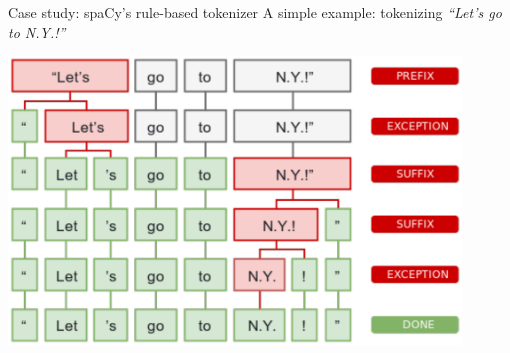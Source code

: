 \documentclass[style=upen, size=14pt]{powerdot}
\theoremstyle{definition}
\begin{document}
\begin{slide}[toc=spaCy]{Case study: spaCy's rule-based tokenizer}
  A simple example: tokenizing \emph{``Let's go to N.Y.!''}
    \begin{center}
      \includegraphics[width=0.9\textwidth]{figures/spacy_tokenizer.eps}
    \end{center}
    \footnotesize{}
\end{slide}
\end{document}
